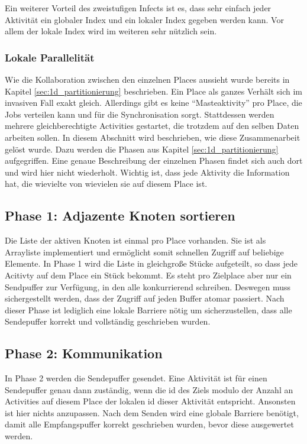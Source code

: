Ein weiterer Vorteil des zweistufigen Infects ist es, dass sehr einfach jeder Aktivität ein globaler Index und ein lokaler Index gegeben werden kann. Vor allem der lokale Index wird im weiteren sehr nützlich sein.

\subsubsection{Lokale Parallelität} %
\label{ssub:lokale_parallelit_t}
Wie die Kollaboration zwischen den einzelnen Places aussieht wurde bereits in Kapitel \ref{sec:1d_partitionierung} beschrieben. Ein Place als ganzes Verhält sich im invasiven Fall exakt gleich. Allerdings gibt es keine \enquote{Masteaktivity} pro Place, die Jobs verteilen kann und für die Synchronisation sorgt. Stattdessen werden mehrere gleichberechtigte Activities gestartet, die trotzdem auf den selben Daten arbeiten sollen. In diesem Abschnitt wird beschrieben, wie diese Zusammenarbeit gelöst wurde. Dazu werden die Phasen aus Kapitel \ref{sec:1d_partitionierung} aufgegriffen. Eine genaue Beschreibung der einzelnen Phasen findet sich auch dort und wird hier nicht wiederholt. Wichtig ist, dass jede Aktivity die Information hat, die wievielte von wievielen sie auf diesem Place ist.

\subsection{Phase 1: Adjazente Knoten sortieren} %
\label{sub:phase_1_invasive}
Die Liste der aktiven Knoten ist einmal pro Place vorhanden. Sie ist als Arrayliste implementiert und ermöglicht somit schnellen Zugriff auf beliebige Elemente. In Phase 1 wird die Liste in gleichgroße Stücke aufgeteilt, so dass jede Acitivty auf dem Place ein Stück bekommt. Es steht pro Zielplace aber nur ein Sendpuffer zur Verfügung, in den alle konkurrierend schreiben. Deswegen muss sichergestellt werden, dass der Zugriff auf jeden Buffer atomar passiert. Nach dieser Phase ist lediglich eine lokale Barriere nötig um sicherzustellen, dass alle Sendepuffer korrekt und vollständig geschrieben wurden. 

\subsection{Phase 2: Kommunikation} %
\label{sub:parallel_phase_2_invasive}
In Phase 2 werden die Sendepuffer gesendet. Eine Aktivität ist für einen Sendepuffer genau dann zuständig, wenn die id des Ziels modulo der Anzahl an Activities auf diesem Place der lokalen id dieser Aktivität entspricht. Ansonsten ist hier nichts anzupassen. Nach dem Senden wird eine globale Barriere benötigt, damit alle Empfangspuffer korrekt geschrieben wurden, bevor diese ausgewertet werden.

